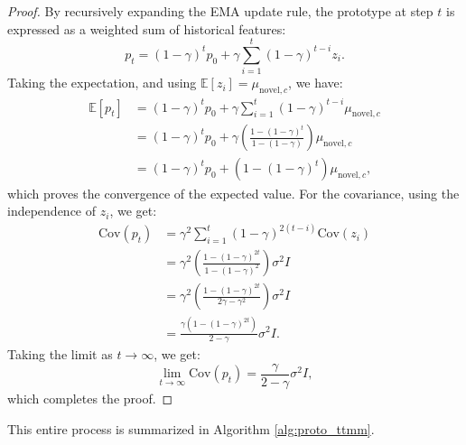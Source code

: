 \documentclass[twoside]{article}
\begin{document}
\begin{proof}
By recursively expanding the EMA update rule, the prototype at step $t$ is expressed as a weighted sum of historical features:
\begin{equation*}
p_t = (1-\gamma)^t p_0 + \gamma \sum_{i=1}^t (1-\gamma)^{t-i} z_i.
\end{equation*}
Taking the expectation, and using $\mathbb{E}[z_i] = \mu_{\mathrm{novel},c}$, we have:
\begin{align*}
\mathbb{E}[p_t] &= (1-\gamma)^t p_0 + \gamma \sum_{i=1}^t (1-\gamma)^{t-i} \mu_{\mathrm{novel},c} \\
&= (1-\gamma)^t p_0 + \gamma \left( \frac{1 - (1-\gamma)^t}{1 - (1-\gamma)} \right) \mu_{\mathrm{novel},c} \\
&= (1-\gamma)^t p_0 + \left(1 - (1-\gamma)^t\right) \mu_{\mathrm{novel},c},
\end{align*}
which proves the convergence of the expected value. For the covariance, using the independence of $z_i$, we get:
\begin{align*}
\mathrm{Cov}(p_t) &= \gamma^2 \sum_{i=1}^t (1-\gamma)^{2(t-i)} \mathrm{Cov}(z_i) \\
&= \gamma^2 \left( \frac{1 - (1-\gamma)^{2t}}{1 - (1-\gamma)^2} \right) \sigma^2 I \\
&= \gamma^2 \left( \frac{1 - (1-\gamma)^{2t}}{2\gamma - \gamma^2} \right) \sigma^2 I \\
&= \frac{\gamma(1 - (1-\gamma)^{2t})}{2-\gamma} \sigma^2 I.
\end{align*}
Taking the limit as $t \to \infty$, we get:
\begin{equation*}
\lim_{t \to \infty} \mathrm{Cov}(p_t) = \frac{\gamma}{2-\gamma} \sigma^2 I,
\end{equation*}
which completes the proof.
\end{proof}

This entire process is summarized in Algorithm \ref{alg:proto_ttmm}.
\end{document}
